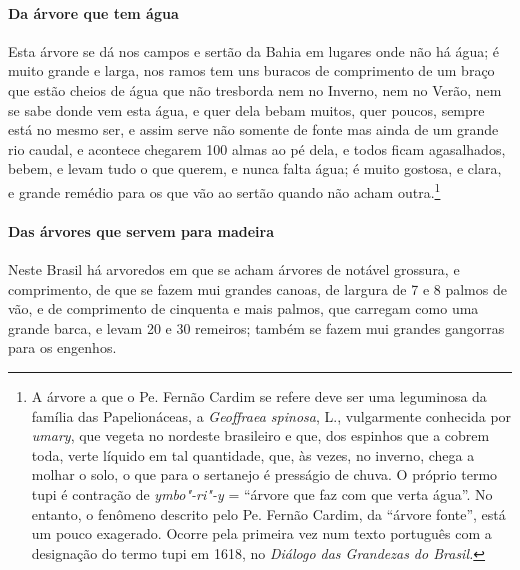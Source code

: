 \paragraph{Da árvore que tem água}

Esta árvore se dá nos campos e sertão da Bahia em lugares
onde não há água; é muito grande e larga, nos ramos tem uns buracos de
comprimento de um braço que estão cheios de água que não tresborda nem
no Inverno, nem no Verão, nem se sabe donde vem esta água, e quer dela
bebam muitos, quer poucos, sempre está no mesmo ser, e assim serve
não somente de fonte mas ainda de um grande rio caudal, e acontece
chegarem 100 almas ao pé dela, e todos ficam agasalhados, bebem, e
levam tudo o que querem, e nunca falta água; é muito gostosa, e clara,
e grande remédio para os que vão ao sertão quando não acham
outra.\footnote{ A árvore a que o Pe. Fernão Cardim se refere deve ser
uma leguminosa da família das Papelionáceas, a \textit{Geoffraea
spinosa}, L., vulgarmente conhecida por \textit{umary}, que vegeta no
nordeste brasileiro e que, dos espinhos que a cobrem toda, verte
líquido em tal quantidade, que, às vezes, no inverno, chega a molhar o
solo, o que para o sertanejo é presságio de chuva. O próprio termo tupi
é contração de \textit{ymbo"-ri"-y} = ``árvore que faz com que verta
água''. No entanto, o fenômeno descrito pelo Pe. Fernão Cardim, da
``árvore fonte'', está um pouco exagerado. Ocorre pela primeira vez num
texto português com a designação do termo tupi em 1618, no
\textit{Diálogo das Grandezas do Brasil.}} 


\paragraph{Das árvores que servem para madeira}

Neste Brasil há arvoredos em que se acham árvores de notável
grossura, e comprimento, de que se fazem mui grandes canoas, de largura
de 7 e 8 palmos de vão, e de comprimento de cinquenta e mais palmos,
que carregam como uma grande barca, e levam 20 e 30 remeiros; também se
fazem mui grandes gangorras para os engenhos.

